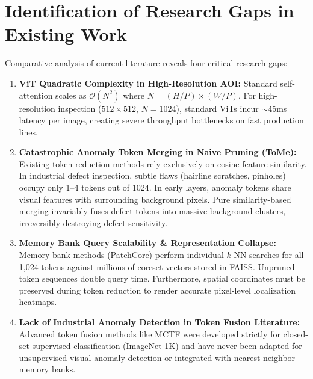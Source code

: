 \documentclass[10pt,journal,compsoc]{IEEEtran}
\begin{document}
\section{Identification of Research Gaps in Existing Work}
Comparative analysis of current literature reveals four critical research gaps:
\begin{enumerate}[label=\textbf{\arabic*.}]
    \item \textbf{ViT Quadratic Complexity in High-Resolution AOI:} Standard self-attention scales as $\mathcal{O}(N^2)$ where $N = (H/P) \times (W/P)$. For high-resolution inspection ($512\times512$, $N = 1024$), standard ViTs incur $\sim$45ms latency per image, creating severe throughput bottlenecks on fast production lines.
    \item \textbf{Catastrophic Anomaly Token Merging in Naive Pruning (ToMe):} Existing token reduction methods rely exclusively on cosine feature similarity. In industrial defect inspection, subtle flaws (hairline scratches, pinholes) occupy only 1--4 tokens out of 1024. In early layers, anomaly tokens share visual features with surrounding background pixels. Pure similarity-based merging invariably fuses defect tokens into massive background clusters, irreversibly destroying defect sensitivity.
    \item \textbf{Memory Bank Query Scalability \& Representation Collapse:} Memory-bank methods (PatchCore) perform individual $k$-NN searches for all 1,024 tokens against millions of coreset vectors stored in FAISS. Unpruned token sequences double query time. Furthermore, spatial coordinates must be preserved during token reduction to render accurate pixel-level localization heatmaps.
    \item \textbf{Lack of Industrial Anomaly Detection in Token Fusion Literature:} Advanced token fusion methods like MCTF \cite{lee2024multi} were developed strictly for closed-set supervised classification (ImageNet-1K) and have never been adapted for unsupervised visual anomaly detection or integrated with nearest-neighbor memory banks.
\end{enumerate}
\end{document}
